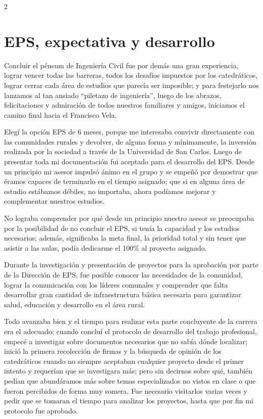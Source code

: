 \documentclass[12pt,spanish,Letterpaper,openany]{book}
\begin{document}
\begin {multicols}{2}

\hypertarget{eps-expectativa-y-desarrollo}{%
\section{EPS, expectativa y desarrollo}\label{eps-expectativa-y-desarrollo}}

Concluir el pénsum de Ingeniería Civil fue por demás una gran experiencia, lograr vencer todas las barreras, todos los desafíos impuestos por los catedráticos, lograr cerrar cada área de estudios que parecía ser imposible; y para festejarlo nos lanzamos al tan ansiado ``piletazo de ingeniería'', luego de los abrazos, felicitaciones y admiración de todos nuestros familiares y amigos, iniciamos el camino final hacia el Francisco Vela.

Elegí la opción EPS de 6 meses, porque me interesaba convivir directamente con las comunidades rurales y devolver, de alguna forma y mínimamente, la inversión realizada por la sociedad a través de la Universidad de San Carlos. Luego de presentar toda mi documentación fui aceptado para el desarrollo del EPS. Desde un principio mi asesor impulsó ánimo en el grupo y se empeñó por demostrar que éramos capaces de terminarlo en el tiempo asignado; que si en alguna área de estudio estábamos débiles, no importaba, ahora podíamos mejorar y complementar nuestros estudios.

No lograba comprender por qué desde un principio nuestro asesor se preocupaba por la posibilidad de no concluir el EPS, si tenía la capacidad y los estudios necesarios; además, significaba la meta final, la prioridad total y sin tener que asistir a las aulas, podía dedicarme el 100\% al proyecto asignado.

Durante la investigación y presentación de proyectos para la aprobación por parte de la Dirección de EPS, fue posible conocer las necesidades de la comunidad, lograr la comunicación con los líderes comunales y comprender que falta desarrollar gran cantidad de infraestructura básica necesaria para garantizar salud, educación y desarrollo en el área rural.

Todo avanzaba bien y el tiempo para realizar esta parte concluyente de la carrera era el adecuado; cuando concluí el protocolo de desarrollo del trabajo profesional, empecé a investigar sobre documentos necesarios que no sabía dónde localizar; inició la primera recolección de firmas y la búsqueda de opinión de los catedráticos cuando no siempre aceptaban cualquier proyecto desde el primer intento y requerían que se investigara más; pero sin decirnos sobre qué, también pedían que abundáramos más sobre temas especializados no vistos en clase o que fueron percibidos de forma muy somera. Fue necesario visitarlos varias veces y pedir que se tomaran el tiempo para analizar los proyectos, hasta que por fin mi protocolo fue aprobado.


\end{multicols}
\end{document}

